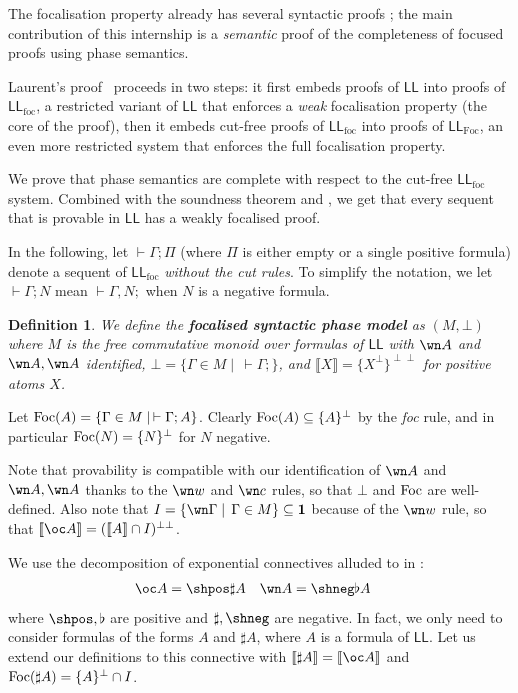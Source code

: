 \documentclass[11pt]{article}
\newtheorem{definition}{Definition}[section]
\newcommand\LL{\textsf{LL}}
\newcommand\0{\textbf{0}}
\newcommand\1{\textbf{1}}
\newcommand\LLfoc{{\LL_\text{foc}}}
\newcommand\LLFoc{{\LL_\text{Foc}}}
\newcommand\sem[1]{{\llbracket #1 \rrbracket}}
\newcommand\biperp{{\perp\perp}}
\newcommand\Foc{\textup{Foc}}
\begin{document}
The focalisation property already has several syntactic proofs \cite{andreoli} \cite{saurin} \cite{laurent}; the main
contribution of this internship is a \emph{semantic} proof of the completeness of focused proofs
using phase semantics.

Laurent's proof~\cite{laurent} proceeds in two steps: it first embeds proofs of $\LL$ into proofs of $\LLfoc$, a
restricted variant of $\LL$ that enforces a \emph{weak} focalisation property (the core of the proof),
then it embeds cut-free proofs of $\LLfoc$ into proofs of $\LLFoc$, an even more restricted system that enforces
the full focalisation property.

We prove that phase semantics are complete with respect to the cut-free $\LLfoc$ system. Combined with the soundness theorem
and \cite[proposition 1]{laurent}, we get that every sequent that is provable in $\LL$ has a weakly focalised proof.

In the following, let $\vdash \Gamma; \Pi$ (where $\Pi$ is either empty or a single positive formula) denote a sequent
of $\LLfoc$ \emph{without the cut rules}.
To simplify the notation, we let $\vdash \Gamma; N$ mean $\vdash \Gamma, N;$ when $N$ is a negative formula.

\begin{definition}
We define the \textbf{focalised syntactic phase model} as $(M, \bot)$ where $M$ is the
free commutative monoid over formulas of $\LL$ with $\wn A$ and $\wn A, \wn A$ identified,
$\bot = \{\Gamma \in M \mid\,\vdash \Gamma;\}$, and $\sem{X} = \{X^\perp\}^\biperp$ for positive atoms $X$.
\end{definition}

Let $\Foc(A) = {\{\Gamma \in M \mid\, \vdash \Gamma; A\}}$.
Clearly $\Foc(A) \subseteq \{A\}^\perp$ by the \textit{foc} rule, and in particular
$\Foc(N) = \{N\}^\perp$ for $N$ negative.

Note that provability is compatible with our identification of $\wn A$ and $\wn A, \wn A$ thanks to the $\wn w$ and $\wn c$ rules,
so that $\bot$ and $\Foc$ are well-defined. Also note that $I = \{\wn \Gamma\mid\,\Gamma\in M\} \subseteq \1$ because of the
$\wn w$ rule, so that $\sem{\oc A} = (\sem{A} \cap I)^\biperp$.

We use the decomposition of exponential connectives alluded to in \cite[section 4.1]{laurent}: \begin{align*}
    \oc A &= \shpos\sharp A & \wn A &= \shneg\flat A
\end{align*}
where $\shpos, \flat$ are positive and $\sharp, \shneg$ are negative.
In fact, we only need to consider formulas of the forms $A$ and $\sharp A$, where $A$ is a formula of $\LL$.
Let us extend our definitions to this connective
with $\sem{\sharp A} = \sem{\oc A}$ and $\Foc(\sharp A) = \{A\}^\perp \cap I$.
\end{document}
